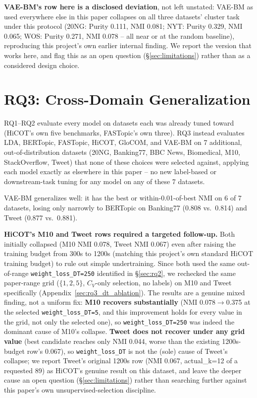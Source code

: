 \documentclass[11pt]{article}
\begin{document}
\textbf{VAE-BM's row here is a disclosed deviation}, not left unstated: VAE-BM as used everywhere else in this paper collapses on all three datasets' cluster task under this protocol (20NG: Purity 0.111, NMI 0.081; NYT: Purity 0.329, NMI 0.065; WOS: Purity 0.271, NMI 0.078 -- all near or at the random baseline), reproducing this project's own earlier internal finding. We report the version that works here, and flag this as an open question (\S\ref{sec:limitations}) rather than as a considered design choice.

\section{RQ3: Cross-Domain Generalization}
\label{sec:rq3}

RQ1--RQ2 evaluate every model on datasets each was already tuned toward (HiCOT's own five benchmarks, FASTopic's own three). RQ3 instead evaluates LDA, BERTopic, FASTopic, HiCOT, GloCOM, and VAE-BM on 7 additional, out-of-distribution datasets (20NG, Banking77, BBC News, Biomedical, M10, StackOverflow, Tweet) that none of these choices were selected against, applying each model exactly as elsewhere in this paper -- no new label-based or downstream-task tuning for any model on any of these 7 datasets.



VAE-BM generalizes well: it has the best or within-0.01-of-best NMI on 6 of 7 datasets, losing only narrowly to BERTopic on Banking77 (0.808 vs.\ 0.814) and Tweet (0.877 vs.\ 0.881).

\textbf{HiCOT's M10 and Tweet rows required a targeted follow-up.} Both initially collapsed (M10 NMI 0.078, Tweet NMI 0.067) even after raising the training budget from 300s to 1200s (matching this project's own standard HiCOT training budget) to rule out simple undertraining. Since both used the same out-of-range \texttt{weight\_loss\_DT=250} identified in \S\ref{sec:rq2}, we rechecked the same paper-range grid ($\{1,2,5\}$, $C_V$-only selection, no labels) on M10 and Tweet specifically (Appendix~\ref{sec:rq3_dt_ablation}). The results are a genuine mixed finding, not a uniform fix: \textbf{M10 recovers substantially} (NMI 0.078$\to$0.375 at the selected \texttt{weight\_loss\_DT=5}, and this improvement holds for every value in the grid, not only the selected one), so \texttt{weight\_loss\_DT=250} was indeed the dominant cause of M10's collapse. \textbf{Tweet does not recover under any grid value} (best candidate reaches only NMI 0.044, worse than the existing 1200s-budget row's 0.067), so \texttt{weight\_loss\_DT} is not the (sole) cause of Tweet's collapse; we report Tweet's original 1200s row (NMI 0.067, actual\_k=12 of a requested 89) as HiCOT's genuine result on this dataset, and leave the deeper cause an open question (\S\ref{sec:limitations}) rather than searching further against this paper's own unsupervised-selection discipline.
\end{document}
